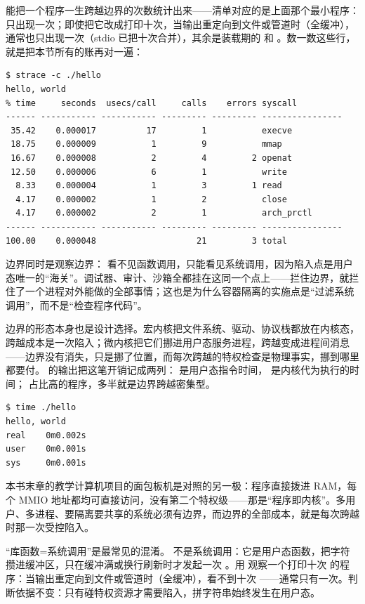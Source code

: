  能把一个程序一生跨越边界的次数统计出来——清单对应的是上面那个最小程序： 只出现一次；即使把它改成打印十次，当输出重定向到文件或管道时（全缓冲）， 通常也只出现一次（stdio 已把十次合并），其余是装载期的  和 。数一数这些行，就是把本节所有的账再对一遍：

\begin{lstlisting}
$ strace -c ./hello
hello, world
% time     seconds  usecs/call     calls    errors syscall
------ ----------- ----------- --------- --------- ----------------
 35.42    0.000017          17         1           execve
 18.75    0.000009           1         9           mmap
 16.67    0.000008           2         4         2 openat
 12.50    0.000006           6         1           write
  8.33    0.000004           1         3         1 read
  4.17    0.000002           1         2           close
  4.17    0.000002           2         1           arch_prctl
------ ----------- ----------- --------- --------- ----------------
100.00    0.000048                    21         3 total
\end{lstlisting}

边界同时是观察边界： 看不见函数调用，只能看见系统调用，因为陷入点是用户态唯一的“海关”。调试器、审计、沙箱全都挂在这同一个点上——拦住边界，就拦住了一个进程对外能做的全部事情；这也是为什么容器隔离的实施点是“过滤系统调用”，而不是“检查程序代码”。

边界的形态本身也是设计选择。宏内核把文件系统、驱动、协议栈都放在内核态，跨越成本是一次陷入；微内核把它们挪进用户态服务进程，跨越变成进程间消息——边界没有消失，只是挪了位置，而每次跨越的特权检查是物理事实，挪到哪里都要付。 的输出把这笔开销记成两列： 是用户态指令时间， 是内核代为执行的时间； 占比高的程序，多半就是边界跨越密集型。

\begin{lstlisting}
$ time ./hello
hello, world
real    0m0.002s
user    0m0.001s
sys     0m0.001s
\end{lstlisting}

本书末章的教学计算机项目的面包板机是对照的另一极：程序直接拨进 RAM，每个 MMIO 地址都均可直接访问，没有第二个特权级——那是“程序即内核”。多用户、多进程、要隔离要共享的系统必须有边界，而边界的全部成本，就是每次跨越时那一次受控陷入。

\begin{warningbox}
“库函数=系统调用”是最常见的混淆。 不是系统调用：它是用户态函数，把字符攒进缓冲区，只在缓冲满或换行刷新时才发起一次 。用  观察一个打印十次  的程序：当输出重定向到文件或管道时（全缓冲），看不到十次 ——通常只有一次。判断依据不变：只有碰特权资源才需要陷入，拼字符串始终发生在用户态。
\end{warningbox}

